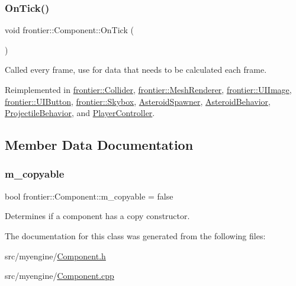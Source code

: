 \subsubsection{\texorpdfstring{On\+Tick()}{OnTick()}}
{\footnotesize\ttfamily void frontier\+::\+Component\+::\+On\+Tick (\begin{DoxyParamCaption}{ }\end{DoxyParamCaption})\hspace{0.3cm}{\ttfamily [virtual]}}



Called every frame, use for data that needs to be calculated each frame. 



Reimplemented in \hyperlink{classfrontier_1_1_collider_ac03782c94e8f7a2064ea1441cbd12c81}{frontier\+::\+Collider}, \hyperlink{classfrontier_1_1_mesh_renderer_acffde7174ddb009751e360df5d346922}{frontier\+::\+Mesh\+Renderer}, \hyperlink{classfrontier_1_1_u_i_image_a4e0d055c0add55fa5e63ae892ea59498}{frontier\+::\+U\+I\+Image}, \hyperlink{classfrontier_1_1_u_i_button_a8eda4323e4d0c2cd2c6a4639f39a1a09}{frontier\+::\+U\+I\+Button}, \hyperlink{classfrontier_1_1_skybox_a38b2ec1a28314c901f4388745d8f0471}{frontier\+::\+Skybox}, \hyperlink{class_asteroid_spawner_acd2744a9a1ac8f13ac28220b33b9f750}{Asteroid\+Spawner}, \hyperlink{class_asteroid_behavior_a3c1287599e132b49be851d9eeec6380e}{Asteroid\+Behavior}, \hyperlink{class_projectile_behavior_a7756651ba998e7f3c0abcafcf25796ae}{Projectile\+Behavior}, and \hyperlink{class_player_controller_a5641058df338563ff6bb6bce7645ef7b}{Player\+Controller}.



\subsection{Member Data Documentation}
\mbox{\label{classfrontier_1_1_component_ad15af6da45dff3b37abb83bd5697fd87}} 
\subsubsection{\texorpdfstring{m\+\_\+copyable}{m\_copyable}}
{\footnotesize\ttfamily bool frontier\+::\+Component\+::m\+\_\+copyable = false\hspace{0.3cm}{\ttfamily [protected]}}



Determines if a component has a copy constructor. 



The documentation for this class was generated from the following files\+:\begin{DoxyCompactItemize}
\item 
src/myengine/\hyperlink{_component_8h}{Component.\+h}\item 
src/myengine/\hyperlink{_component_8cpp}{Component.\+cpp}\end{DoxyCompactItemize}

